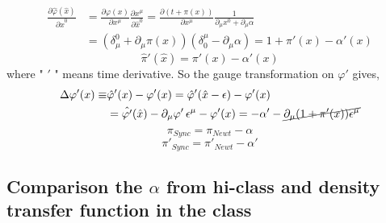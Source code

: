 \documentclass[a4paper,14pt]{article}
\newcommand {\be}{\begin{equation}}
\newcommand {\ee}{\end{equation}}
\begin{document}
\begin{align}
 \frac{ \partial \hat{\varphi} (\hat{x})}{ \partial \hat{x}^0} & = \frac{ \partial \varphi  (x)}{ \partial x ^{\mu}}   \frac{\partial x^{\mu}}{\partial \hat{x}^0}
 = \frac{ \partial (t+ \pi (x))}{ \partial x ^{\mu}}   \frac{1}{\partial_{\mu} x^0 + \partial_{\mu} \alpha}
 \\ \nonumber &
 = (\delta_{\mu} ^0 + \partial_{\mu} \pi (x)) \left(\delta^{\mu}_0 - \partial_{\mu } \alpha \right)= 1+ \pi'(x) -  \alpha' (x)
\end{align}
\be
\hat{\pi}'(\hat{x})= \pi '(x) -\alpha '  (x)
\ee
where " $'$ " means time derivative.
So the gauge transformation on $\varphi '$ gives,
\begin{align}
\Delta { \varphi'(x)}\equiv & \hat{\varphi} ' (x)-  \varphi ' (x)=\hat{\varphi} ' (\hat{x}-\epsilon) -  \varphi ' (x) 
 \\ \nonumber &
 =\hat{\varphi'} (\hat{x}) - \partial _ {\mu} \varphi' \, \epsilon ^{\mu} - \varphi' (x)=- \alpha' - \cancel{\partial_{\mu} (1+ \pi '(x)) \epsilon^{\mu}}
\end{align}
\be
\pi_{Sync}=\pi_{Newt} - \alpha
\ee
\be
\pi'_{Sync}=\pi'_{Newt} -\alpha'
\ee
\subsection{Comparison the $\alpha$ from hi-class and density transfer function in the class}
\end{document}

